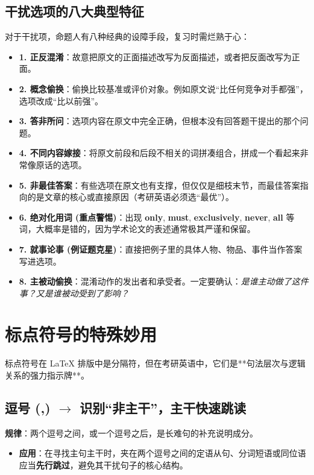 \documentclass[cn,normal,11pt]{elegantnote}
\newcommand{\retrokey}[1]{{\color{accentcolor}\textbf{#1}}}
\begin{document}
\subsection{干扰选项的八大典型特征}
对于干扰项，命题人有八种经典的设障手段，复习时需烂熟于心：
\begin{itemize}
  \item \textbf{1. 正反混淆}：故意把原文的正面描述改写为反面描述，或者把反面改写为正面。
  \item \textbf{2. 概念偷换}：偷换比较基准或评价对象。例如原文说“比任何竞争对手都强”，选项改成“比以前强”。
  \item \textbf{3. 答非所问}：选项内容在原文中完全正确，但根本没有回答题干提出的那个问题。
  \item \textbf{4. 不同内容嫁接}：将原文前段和后段不相关的词拼凑组合，拼成一个看起来非常像原话的选项。
  \item \textbf{5. 非最佳答案}：有些选项在原文也有支撑，但仅仅是细枝末节，而最佳答案指向的是文章的核心或直接原因（考研英语必须选“最优”）。
  \item \textbf{6. 绝对化用词 (重点警惕)}：出现 \textbf{only}, \textbf{must}, \textbf{exclusively}, \textbf{never}, \textbf{all} 等词，大概率是错的，因为学术论文的表述通常极其严谨和保留。
  \item \textbf{7. 就事论事 (例证题克星)}：直接把例子里的具体人物、物品、事件当作答案写进选项。
  \item \textbf{8. 主被动偷换}：混淆动作的发出者和承受者。一定要确认：\textit{是谁主动做了这件事？又是谁被动受到了影响？}
\end{itemize}

\section{标点符号的特殊妙用}
标点符号在 LaTeX 排版中是分隔符，但在考研英语中，它们是**句法层次与逻辑关系的强力指示牌**。

\subsection{逗号 (,) \ensuremath{\rightarrow} 识别“非主干”，主干快速跳读}
\textbf{规律}：两个逗号之间，或一个逗号之后，是长难句的补充说明成分。
\begin{itemize}
  \item \textbf{应用}：在寻找主句主干时，夹在两个逗号之间的定语从句、分词短语或同位语应当\retrokey{先行跳过}，避免其干扰句子的核心结构。
\end{itemize}
\end{document}
